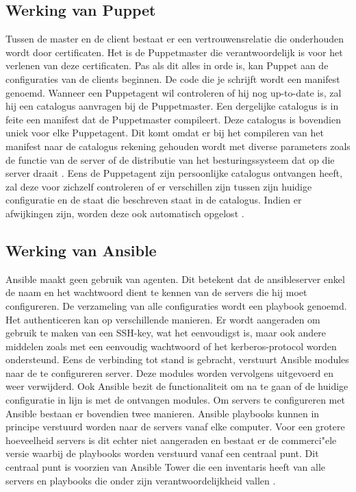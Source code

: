  \autocite{languagePuppet}\autocite{masterproef} \autocite{ansibledoc}

\subsection{Werking van Puppet}

Tussen de master en de client bestaat er een vertrouwensrelatie die onderhouden wordt door certificaten. Het is de Puppetmaster die verantwoordelijk is voor het verlenen van deze certificaten. Pas als dit alles in orde is, kan Puppet  aan de configuraties van de clients beginnen. De code die je schrijft wordt een manifest genoemd. Wanneer een Puppetagent wil controleren of hij nog up-to-date is, zal hij een catalogus aanvragen bij de Puppetmaster. Een dergelijke catalogus is in feite een manifest dat de Puppetmaster compileert. Deze catalogus is bovendien uniek voor elke Puppetagent. Dit komt omdat er bij het compileren van het manifest naar de catalogus rekening gehouden wordt met diverse parameters zoals de functie van de server of de distributie van het besturingssysteem dat op die server draait \autocite{Puppetlanguagecatalog}. Eens de Puppetagent zijn persoonlijke catalogus ontvangen heeft, zal deze voor zichzelf controleren of er verschillen zijn tussen zijn huidige configuratie en de staat die beschreven staat in de catalogus. Indien er afwijkingen zijn, worden deze ook automatisch opgelost \autocite{Puppetdoc}.

\subsection{Werking van Ansible}


Ansible maakt geen gebruik van agenten. Dit betekent dat de ansibleserver enkel de naam en het wachtwoord dient te kennen van de servers die hij moet configureren. De verzameling van alle configuraties wordt een playbook genoemd. Het authenticeren kan op verschillende manieren. Er wordt aangeraden om gebruik te maken van een SSH-key, wat het eenvoudigst is, maar ook andere middelen zoals met een eenvoudig wachtwoord of het kerberos-protocol worden ondersteund. Eens de verbinding tot stand is gebracht, verstuurt Ansible modules naar de te configureren server. Deze modules worden vervolgens uitgevoerd en weer verwijderd. Ook Ansible bezit de functionaliteit om na te gaan of de huidige configuratie in lijn is met de ontvangen modules. Om servers te configureren met Ansible bestaan er bovendien twee manieren. Ansible playbooks kunnen in principe verstuurd worden naar de servers vanaf elke computer. Voor een grotere hoeveelheid servers is dit echter niet aangeraden en bestaat er de commerci"ele versie waarbij de playbooks worden verstuurd vanaf een centraal punt. Dit centraal punt is voorzien van Ansible Tower die een inventaris heeft van alle servers en playbooks die onder zijn verantwoordelijkheid vallen \autocite{ansibledoc}.


